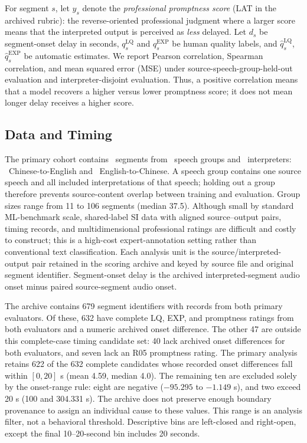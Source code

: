 For segment $s$, let $y_s$ denote the \emph{professional promptness score} (LAT in the archived rubric): the reverse-oriented professional judgment where a larger score means that the interpreted output is perceived as \emph{less} delayed. Let $d_s$ be segment-onset delay in seconds, $q_s^{\mathrm{LQ}}$ and $q_s^{\mathrm{EXP}}$ be human quality labels, and $\hat q_s^{\mathrm{LQ}}$, $\hat q_s^{\mathrm{EXP}}$ be automatic estimates. We report Pearson correlation, Spearman correlation, and mean squared error (MSE) under source-speech-group-held-out evaluation and interpreter-disjoint evaluation. Thus, a positive correlation means that a model recovers a higher versus lower promptness score; it does not mean longer delay receives a higher score.

\subsection{Data and Timing}
The primary cohort contains \CohortN\ segments from \SpeechGroupN\ speech groups and \InterpreterN\ interpreters: \ZhEnN\ Chinese-to-English and \EnZhN\ English-to-Chinese. A speech group contains one source speech and all included interpretations of that speech; holding out a group therefore prevents source-content overlap between training and evaluation. Group sizes range from 11 to 106 segments (median 37.5). Although small by standard ML-benchmark scale, shared-label SI data with aligned source--output pairs, timing records, and multidimensional professional ratings are difficult and costly to construct; this is a high-cost expert-annotation setting rather than conventional text classification. Each analysis unit is the source/interpreted-output pair retained in the scoring archive and keyed by source file and original segment identifier. Segment-onset delay is the archived interpreted-segment audio onset minus paired source-segment audio onset.

The archive contains 679 segment identifiers with records from both primary evaluators. Of these, 632 have complete LQ, EXP, and promptness ratings from both evaluators and a numeric archived onset difference. The other 47 are outside this complete-case timing candidate set: 40 lack archived onset differences for both evaluators, and seven lack an R05 promptness rating. The primary analysis retains 622 of the 632 complete candidates whose recorded onset differences fall within $[0,20]$ s (mean 4.59, median 4.0). The remaining ten are excluded solely by the onset-range rule: eight are negative ($-95.295$ to $-1.149$ s), and two exceed 20 s (100 and 304.331 s). The archive does not preserve enough boundary provenance to assign an individual cause to these values. This range is an analysis filter, not a behavioral threshold. Descriptive bins are left-closed and right-open, except the final 10--20-second bin includes 20 seconds.

